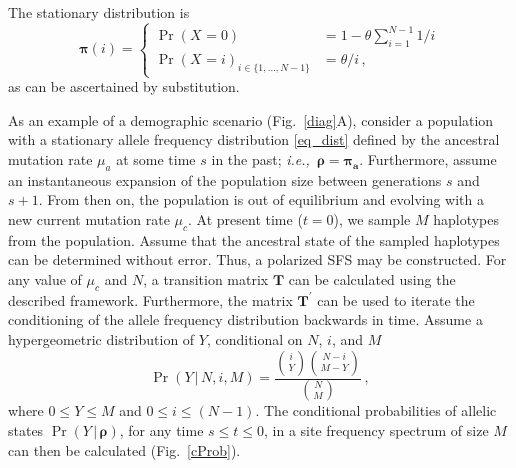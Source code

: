 \documentclass[preprint]{elsarticle}
\newcommand{\bs}[1]{\ensuremath{\boldsymbol{#1}}}
\newcommand\given{{\,|\,}}
\newcommand\ie{{\it i.e.,}}
\newcommand\x[1]{\ensuremath{X_{#1}}}
\newcommand\y{\ensuremath{Y}}
\begin{document}
The stationary distribution  is 
\begin{equation}\label{eq_dist}
\bs{\pi}(i)=\begin{cases}
\Pr(\x{}=0)&=1-\theta\sum_{i=1}^{N-1}1/i\\
\Pr(\x{}=i)_{i \in \{1, \ldots, N-1\}} &=\theta/i\,,
\end{cases}
\end{equation}
as can be ascertained by substitution.

As an example of a demographic scenario (Fig.~\ref{diag}A), consider a population with a stationary allele frequency distribution \eqref{eq_dist} defined by the ancestral mutation rate $\mu_a$ at some time $s$ in the past; \ie\ $\bs{\rho} = \bs{\pi_a}$. Furthermore, assume an instantaneous expansion of the population size between generations $s$ and $s+1$. From then on, the population is out of equilibrium and evolving with a new current mutation rate $\mu_c$. At present time ($t=0$), 
we sample $M$ haplotypes from the population. Assume that the ancestral state of the sampled haplotypes can be determined without error. Thus, a polarized SFS may be constructed. For any value of $\mu_c$ and $N$, a transition matrix $\mathbf{T}$ can be calculated using the described framework. Furthermore, the matrix $\mathbf{T}^{'}$ can be used to iterate the conditioning of the allele frequency distribution backwards in time. Assume a hypergeometric distribution of $Y$, conditional on $N$, $i$, and $M$
\begin{equation}\label{X0}
\Pr(\y\given N,i,M)=\frac{\binom{i}{\y}\binom{N-i}{M-\y}}{\binom{N}{M}}\,,
\end{equation}
where $0\leq \y\leq M$ and $0\leq i\leq (N-1)$. The conditional probabilities of allelic states $\Pr(\y \given \bs{\rho})$, for any time $s\leq t\leq 0$, in a site frequency spectrum of size $M$ can then be calculated (Fig.~\ref{cProb}). %
\end{document}
